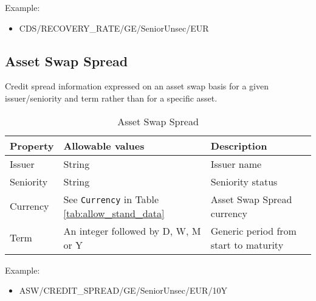 Example: 
\begin{itemize}
\item {CDS/RECOVERY\_RATE/GE/SeniorUnsec/EUR}
\end{itemize}


\subsection{Asset Swap Spread}

Credit spread information expressed on an asset swap basis for a  given issuer/seniority and term rather than for a specific asset.
 
\begin{table}[H]
\centering
\begin{tabular}{|p{3cm}|p{3.5cm}|p{7cm}|}
\hline
{\bf Property} & {\bf Allowable values} & {\bf Description} \\
\hline
Issuer & String &  Issuer name \\ \hline
Seniority & String &  Seniority status \\ \hline
Currency & See \lstinline!Currency! in Table \ref{tab:allow_stand_data} & Asset Swap Spread currency\\ \hline
Term & An integer followed by D, W, M or Y & Generic period from start to maturity\\ \hline
\end{tabular}
  \caption{Asset Swap Spread}
  \label{tab:aswapspread_quote}
\end{table}

Example: 
\begin{itemize}
\item {ASW/CREDIT\_SPREAD/GE/SeniorUnsec/EUR/10Y}
\end{itemize}


